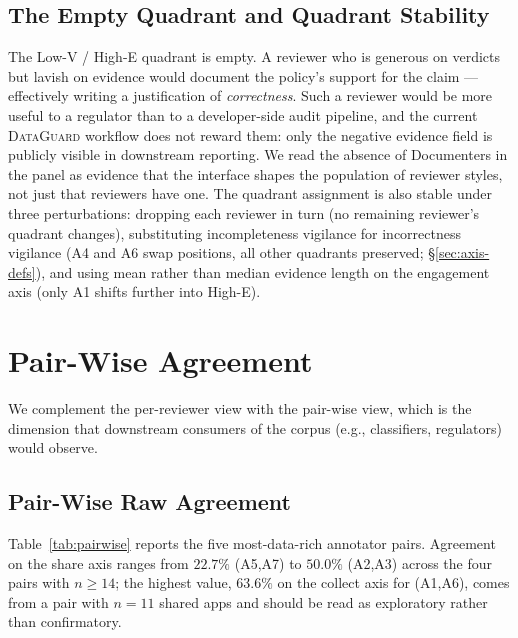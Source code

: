 \documentclass[11pt,a4paper]{article}
\newcommand{\dataguard}{\textsc{DataGuard}}
\newcommand{\Acc}[1]{\textsf{A#1}}
\begin{document}
\subsection{The Empty Quadrant and Quadrant Stability}
\label{sec:empty-quadrant}

The Low-V / High-E quadrant is empty. A reviewer who is generous on
verdicts but lavish on evidence would document the policy's support
for the claim --- effectively writing a justification of
\emph{correctness}. Such a reviewer would be more useful to a
regulator than to a developer-side audit pipeline, and the current
\dataguard{} workflow does not reward them: only the negative
evidence field is publicly visible in downstream reporting. We read
the absence of Documenters in the panel as evidence that the
interface shapes the population of reviewer styles, not just that
reviewers have one. The quadrant assignment is also stable under
three perturbations: dropping each reviewer in turn (no remaining
reviewer's quadrant changes), substituting incompleteness vigilance
for incorrectness vigilance (\Acc{4} and \Acc{6} swap positions, all
other quadrants preserved; \S\ref{sec:axis-defs}), and using mean
rather than median evidence length on the engagement axis (only
\Acc{1} shifts further into High-E).
\label{sec:axis-robustness}

\section{Pair-Wise Agreement}
\label{sec:pair-agree}

We complement the per-reviewer view with the pair-wise view, which
is the dimension that downstream consumers of the corpus (e.g.,
classifiers, regulators) would observe.

\subsection{Pair-Wise Raw Agreement}
\label{sec:pair-raw}

Table~\ref{tab:pairwise} reports the five most-data-rich annotator
pairs. Agreement on the share axis ranges from $22.7\%$
(\Acc{5},\Acc{7}) to $50.0\%$ (\Acc{2},\Acc{3}) across the four
pairs with $n\ge 14$; the highest value, $63.6\%$ on the collect
axis for (\Acc{1},\Acc{6}), comes from a pair with $n=11$ shared
apps and should be read as exploratory rather than confirmatory.
\end{document}
